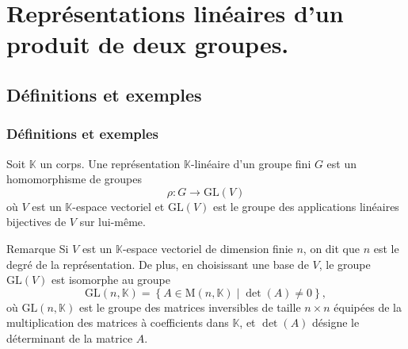 \documentclass[9pt]{beamer}
\begin{document}
	\section{Représentations linéaires d'un produit de deux groupes.}
	\subsection{Définitions et exemples}
	
	\begin{frame}
		\frametitle{Définitions et exemples}
		
		\begin{definition} 
Soit \(\mathbb{K}\) un corps. Une représentation \(\mathbb{K}\)-linéaire d'un groupe fini \(G\) est un homomorphisme de groupes
			\[
			\rho : G \rightarrow \mathrm{GL}(V)
			\]
où \(V\) est un \(\mathbb{K}\)-espace vectoriel et \(\mathrm{GL}(V)\) est le groupe des applications linéaires bijectives de \(V\) sur lui-même.
		\end{definition}

		
		\begin{block}{Remarque} 
Si \(V\) est un \(\mathbb{K}\)-espace vectoriel de dimension finie \(n\), on dit que \(n\) est le degré de la représentation. De plus, en choisissant une base de \(V\), le groupe \(\mathrm{GL}(V)\) est isomorphe au groupe
			\[
			\mathrm{GL}(n, \mathbb{K}) = \left\{ A \in \mathrm{M}(n, \mathbb{K}) \mid \det(A) \neq 0 \right\},
			\]
où \(\mathrm{GL}(n, \mathbb{K})\) est le groupe des matrices inversibles de taille \(n \times n\) équipées de la multiplication des matrices à coefficients dans \(\mathbb{K}\), et \(\det(A)\) désigne le déterminant de la matrice \(A\).
		\end{block}
	\end{frame}
	
	
\end{document}
